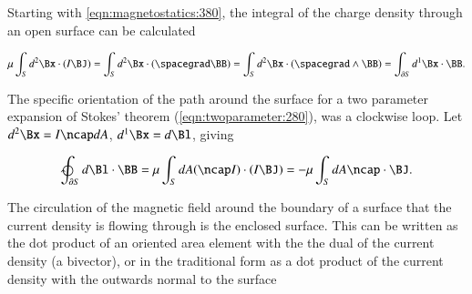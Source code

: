 %
%


Starting with
\cref{eqn:magnetostatics:380}, the
integral of the
charge density through an open surface can be calculated

\begin{dmath}\label{eqn:magnetostatics_enclosedCurrent:720}
\mu \int_S d^2 \Bx \cdot (I \BJ)
=
\int_S d^2 \Bx \cdot (\spacegrad \BB)
=
\int_S d^2 \Bx \cdot (\spacegrad \wedge \BB)
=
\int_{\partial S} d^1 \Bx \cdot \BB.
\end{dmath}

The specific orientation of the path around the surface for a two parameter expansion of Stokes' theorem (\cref{eqn:twoparameter:280}), was a clockwise loop.
Let
\( d^2 \Bx = I \ncap dA \), \( d^1 \Bx = d\Bl \), giving

\begin{dmath}\label{eqn:magnetostatics_enclosedCurrent:740}
\ointclockwise_{\partial S} d\Bl \cdot \BB
= \mu \int_S dA (\ncap I) \cdot (I \BJ)
= -\mu \int_S dA \ncap \cdot \BJ.
\end{dmath}

The circulation of the magnetic field around the boundary of a surface that the current density is flowing through is the enclosed surface.
This can be written as the dot product of an oriented area element with the the dual of the current density (a bivector), or in the traditional form as a dot product of the current density with the outwards normal to the surface



